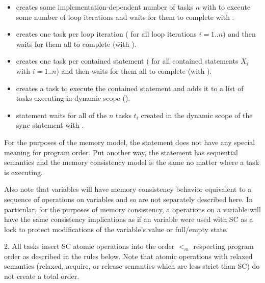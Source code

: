 \begin{itemize}

  \item {} creates some implementation-dependent number of tasks $n$
with  to execute some number of loop
iterations and waits for them to complete with .

  \item {} creates one task per loop iteration ( for all loop iterations $i=1..n$) and then waits for them
all to complete (with ).

  \item {} creates one task per contained statement ( for all contained statements $X_i$ with $i=1..n$) and then
waits for them all to complete (with ).

  \item {} creates a task to execute the contained statement and adds
it to a list of tasks executing in dynamic scope ().

  \item {} statement waits for all of the $n$ tasks $t_i$ created in
the dynamic scope of the sync statement with .

\end{itemize}

For the purposes of the memory model, the  statement does not have any
special meaning for program order. Put another way, the  statement has
sequential semantics and the memory consistency model is the same no matter
where a task is executing.

Also note that  variables will have memory consistency behavior
equivalent to a sequence of operations on  variables and so are
not separately described here. In particular, for the purposes of memory
consistency, a operations on a  variable will have the same
consistency implications as if an  variable were used with
SC as a lock to protect modifications of the 
variable's value or full/empty state.

2. All tasks insert SC atomic operations into the order $<_m$ respecting
program order as described in the rules below. Note that atomic operations with
relaxed semantics (relaxed, acquire, or release semantics which are less strict
than SC) do not create a total order.

